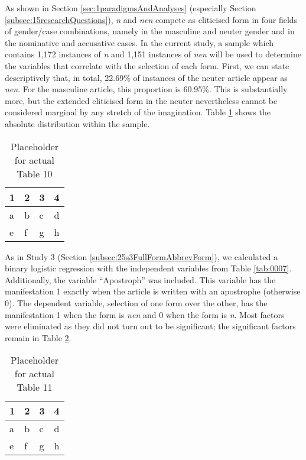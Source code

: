 As shown in Section \ref{sec:1paradigmsAndAnalyses} (especially Section \ref{subsec:15researchQuestions}), \textit{n} and \textit{nen} compete as cliticised form in four fields of gender/case combinations, namely in the masculine and neuter gender and in the nominative and accusative cases.
In the current study, a sample which contains 1,172 instances of \textit{n} and 1,151 instances of \textit{nen} will be used to determine the variables that correlate with the selection of each form.
First, we can state descriptively that, in total, 22.69\% of instances of the neuter article appear as \textit{nen}.
For the masculine article, this proportion is 60.95\%.
This is substantially more, but the extended cliticised form in the neuter nevertheless cannot be considered marginal by any stretch of the imagination.
Table \ref{tab:0010} shows the absolute distribution within the sample.

\begin{table}
	\centering
	\begin{tabular}{llll}
		\toprule
		\textbf{1} & \textbf{2} & \textbf{3} & \textbf{4} \\
		\midrule
		a & b & c & d \\
		e & f & g & h \\
		\bottomrule
	\end{tabular}
	\caption{Placeholder for actual Table 10}
	\label{tab:0010}
\end{table}

As in Study 3 (Section \ref{subsec:25s3FullFormAbbrevForm}), we calculated a binary logistic regression with the independent variables from Table \ref{tab:0007}.
Additionally, the variable ``Apostroph'' was included.
This variable has the manifestation 1 exactly when the article is written with an apostrophe (otherwise 0). 
The dependent variable, selection of one form over the other, has the manifestation 1 when the form is \textit{nen} and 0 when the form is \textit{n}.
Most factors were eliminated as they did not turn out to be significant; the significant factors remain in Table \ref{tab:0011}.

\begin{table}
	\centering
	\begin{tabular}{llll}
		\toprule
		\textbf{1} & \textbf{2} & \textbf{3} & \textbf{4} \\
		\midrule
		a & b & c & d \\
		e & f & g & h \\
		\bottomrule
	\end{tabular}
	\caption{Placeholder for actual Table 11}
	\label{tab:0011}
\end{table}

